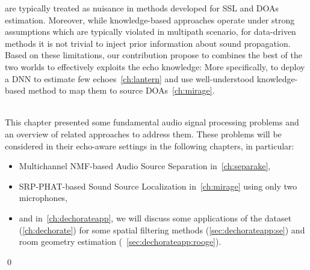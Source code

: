  are typically treated as nuisance in methods developed for \ac{SSL} and \acp{DOA} estimation.
Moreover, while knowledge-based approaches operate under strong assumptions which are typically violated in multipath scenario,
for data-driven methods it is not trivial to inject prior information about sound propagation.
Based on these limitations, our contribution propose to combines the best of the two worlds to effectively exploits the echo knowledge:
More specifically, to deploy a \ac{DNN} to estimate few echoes~\cref{ch:lantern} and use well-understood knowledge-based method to map them to source \acp{DOA}~\cref{ch:mirage}.

\\This chapter presented some fundamental audio signal processing problems and an overview of related approaches to address them.
These problems will be considered in their echo-aware settings in the following chapters, in particular:
\begin{itemize}
    \item Multichannel NMF-based Audio Source Separation in~\cref{ch:separake},
    \item SRP-PHAT-based Sound Source Localization in~\cref{ch:mirage} using only two microphones,
    \item and in~\cref{ch:dechorateapp}, we will discuss some applications of the  dataset (\cref{ch:dechorate}) for some spatial filtering methods (\cref{sec:dechorateapp:se})
            and room geometry estimation (~\cref{sec:dechorateapp:rooge}).
\end{itemize}
\qed

